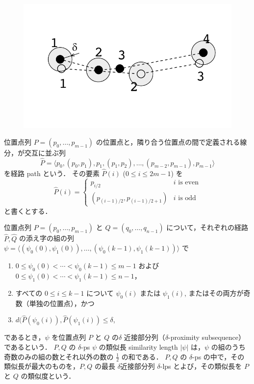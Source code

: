 \documentclass[11pt]{jarticle}
\begin{document}
\begin{figure}[h]
\centering
\includegraphics[scale=0.5]{matching.pdf}
\end{figure}

位置点列 $P=(p_0, \ldots, p_{m-1})$ の位置点と，隣り合う位置点の間で定義される線分，が交互に並ぶ列
\[
\hat{P} = \langle p_0, (p_0, p_1), p_1, (p_1, p_2), \ldots, (p_{m-2}, p_{m-1}), p_{m-1} \rangle
\]
を経路 path という．
その要素 $\hat{P}(i)$ ($0 \leq i \leq 2m-1$) を
\[
\hat{P}(i) = \left\{
\begin{array}{ll}
p_{i/2} & \mbox{$i$ is even}\\
(p_{(i-1)/2}, p_{(i-1)/2 + 1}) & \mbox{$i$ is odd}
\end{array}
\right.
\]
と書くとする． 

位置点列 $P = (p_0, \ldots, p_{m-1})$ と $Q = (q_0, \ldots, q_{n-1})$ について，それぞれの経路 $\hat{P}, \hat{Q}$ の添え字の組の列
$\psi = \langle (\psi_0(0), \psi_1(0)), \ldots, (\psi_0(k-1), \psi_1(k-1)) \rangle$ で
\begin{enumerate}
\item $0 \leq \psi_0(0) < \cdots < \psi_0(k-1) \leq m-1$ および $0 \leq \psi_1(0) < \cdots < \psi_1(k-1) \leq n-1$，
\item すべての $0 \leq i \leq k-1$ について $\psi_0(i)$ または $\psi_1(i)$, またはその両方が奇数（単独の位置点），かつ
\item $d(\hat{P}(\psi_0(i)), \hat{P}(\psi_1(i)) \leq \delta$,  
\end{enumerate}
であるとき，$\psi$ を位置点列 $P$ と $Q$ の$\delta$ 近接部分列（$\delta$-proximity subsequence）であるという．
$P, Q$ の $\delta$-ps $\psi$ の類似長 similarity length $|\psi|$ は，$\psi$ の組のうち奇数のみの組の数とそれ以外の数の $\frac{1}{2}$ の和である．
$P, Q$ の $\delta$-ps の中で，その類似長が最大のものを，$P, Q$ の最長 $\delta$近接部分列 $\delta$-lps とよび，その類似長を $P$ と $Q$ の類似度という．
\end{document}
